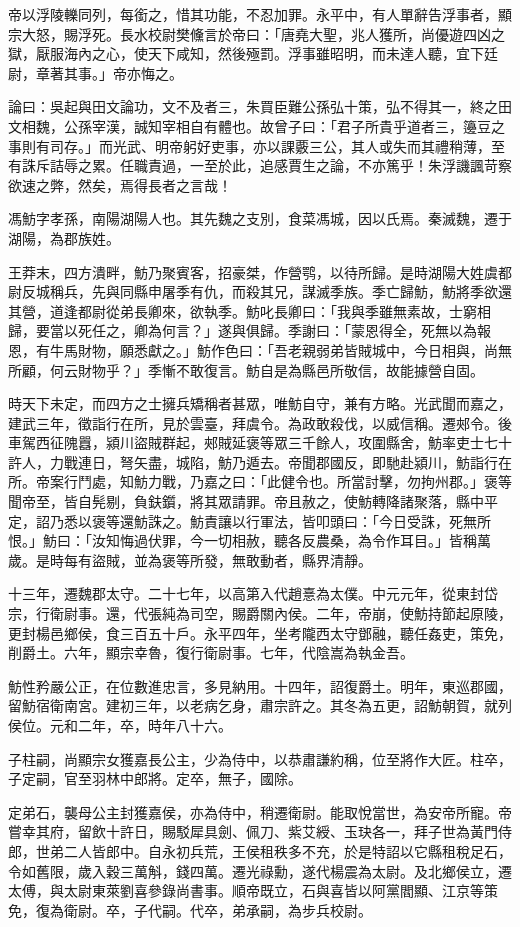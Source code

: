 \begin{pinyinscope}
帝以浮陵轢同列，每銜之，惜其功能，不忍加罪。永平中，有人單辭告浮事者，顯宗大怒，賜浮死。長水校尉樊儵言於帝曰：「唐堯大聖，兆人獲所，尚優遊四凶之獄，厭服海內之心，使天下咸知，然後殛罰。浮事雖昭明，而未達人聽，宜下廷尉，章著其事。」帝亦悔之。

論曰：吳起與田文論功，文不及者三，朱買臣難公孫弘十策，弘不得其一，終之田文相魏，公孫宰漢，誠知宰相自有體也。故曾子曰：「君子所貴乎道者三，籩豆之事則有司存。」而光武、明帝躬好吏事，亦以課覈三公，其人或失而其禮稍薄，至有誅斥詰辱之累。任職責過，一至於此，追感賈生之論，不亦篤乎！朱浮譏諷苛察欲速之弊，然矣，焉得長者之言哉！

馮魴字孝孫，南陽湖陽人也。其先魏之支別，食菜馮城，因以氏焉。秦滅魏，遷于湖陽，為郡族姓。

王莽末，四方潰畔，魴乃聚賓客，招豪桀，作營鹗，以待所歸。是時湖陽大姓虞都尉反城稱兵，先與同縣申屠季有仇，而殺其兄，謀滅季族。季亡歸魴，魴將季欲還其營，道逢都尉從弟長卿來，欲執季。魴叱長卿曰：「我與季雖無素故，士窮相歸，要當以死任之，卿為何言？」遂與俱歸。季謝曰：「蒙恩得全，死無以為報恩，有牛馬財物，願悉獻之。」魴作色曰：「吾老親弱弟皆賊城中，今日相與，尚無所顧，何云財物乎？」季慚不敢復言。魴自是為縣邑所敬信，故能據營自固。

時天下未定，而四方之士擁兵矯稱者甚眾，唯魴自守，兼有方略。光武聞而嘉之，建武三年，徵詣行在所，見於雲臺，拜虞令。為政敢殺伐，以威信稱。遷郟令。後車駕西征隗囂，潁川盜賊群起，郟賊延褒等眾三千餘人，攻圍縣舍，魴率吏士七十許人，力戰連日，弩矢盡，城陷，魴乃遁去。帝聞郡國反，即馳赴潁川，魴詣行在所。帝案行鬥處，知魴力戰，乃嘉之曰：「此健令也。所當討擊，勿拘州郡。」褒等聞帝至，皆自髡剔，負鈇鑕，將其眾請罪。帝且赦之，使魴轉降諸聚落，縣中平定，詔乃悉以褒等還魴誅之。魴責讓以行軍法，皆叩頭曰：「今日受誅，死無所恨。」魴曰：「汝知悔過伏罪，今一切相赦，聽各反農桑，為令作耳目。」皆稱萬歲。是時每有盜賊，並為褒等所發，無敢動者，縣界清靜。

十三年，遷魏郡太守。二十七年，以高第入代趙憙為太僕。中元元年，從東封岱宗，行衛尉事。還，代張純為司空，賜爵關內侯。二年，帝崩，使魴持節起原陵，更封楊邑鄉侯，食三百五十戶。永平四年，坐考隴西太守鄧融，聽任姦吏，策免，削爵土。六年，顯宗幸魯，復行衛尉事。七年，代陰嵩為執金吾。

魴性矜嚴公正，在位數進忠言，多見納用。十四年，詔復爵土。明年，東巡郡國，留魴宿衛南宮。建初三年，以老病乞身，肅宗許之。其冬為五更，詔魴朝賀，就列侯位。元和二年，卒，時年八十六。

子柱嗣，尚顯宗女獲嘉長公主，少為侍中，以恭肅謙約稱，位至將作大匠。柱卒，子定嗣，官至羽林中郎將。定卒，無子，國除。

定弟石，襲母公主封獲嘉侯，亦為侍中，稍遷衛尉。能取悅當世，為安帝所寵。帝嘗幸其府，留飲十許日，賜駁犀具劍、佩刀、紫艾綬、玉玦各一，拜子世為黃門侍郎，世弟二人皆郎中。自永初兵荒，王侯租秩多不充，於是特詔以它縣租稅足石，令如舊限，歲入穀三萬斛，錢四萬。遷光祿勳，遂代楊震為太尉。及北鄉侯立，遷太傅，與太尉東萊劉喜參錄尚書事。順帝既立，石與喜皆以阿黨閻顯、江京等策免，復為衛尉。卒，子代嗣。代卒，弟承嗣，為步兵校尉。


\end{pinyinscope}
